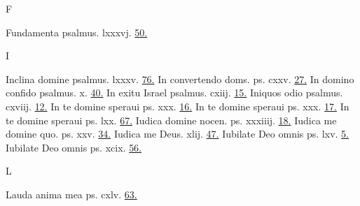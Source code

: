 \documentclass[a5paper,10pt]{book}
\begin{document}
\begin{multicols}{2}
\newline \vspace{-1.75em}
\begin{center}
\color{red} F
\end{center}
\vspace{-.75em}
\par \noindent Fundamenta psalmus. lxxxvj. \hfill \hyperlink{ps86}{50.}
\newline \vspace{-1.75em}
\begin{center}
\color{red} I
\end{center}
\vspace{-.75em}
\par \noindent Inclina domine psalmus. lxxxv. \hfill \hyperlink{ps85}{76.}
\newline In convertendo doms. ps. cxxv. \hfill \hyperlink{ps125}{27.}
\newline In domino confido psalmus. x. \hfill \hyperlink{ps10}{40.}
\newline In exitu Israel psalmus. cxiij. \hfill \hyperlink{ps113}{15.}
\newline Iniquos odio psalmus. cxviij. \hfill \hyperlink{ps118.8}{12.}
\newline In te domine speraui ps. xxx. \hfill \hyperlink{ps30.1}{16.}
\newline In te domine speraui ps. xxx. \hfill \hyperlink{ps30}{17.}
\newline In te domine speraui ps. lxx. \hfill \hyperlink{ps70}{67.}
\newline Iudica domine nocen. ps. xxxiiij. \hfill \hyperlink{ps34}{18.}
\newline Iudica me domine quo. ps. xxv. \hfill \hyperlink{ps25}{34.}
\newline Iudica me Deus. xlij. \hfill \hyperlink{ps42}{47.}
\newline Iubilate Deo omnis ps. lxv. \hfill \hyperlink{ps65}{5.}
\newline Iubilate Deo omnis ps. xcix. \hfill \hyperlink{ps99}{56.}
\newline \vspace{-1.75em}
\begin{center}
\color{red} L
\end{center}
\vspace{-.75em}
\par \noindent Lauda anima mea ps. cxlv. \hfill \hyperlink{ps145}{63.}

\end{multicols}
\end{document}
